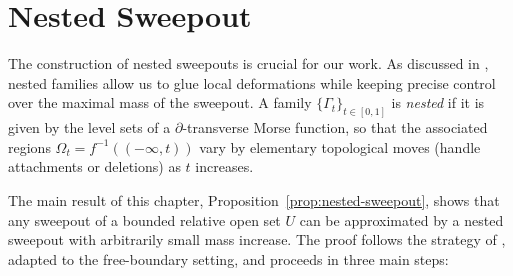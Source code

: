 \chapter{Nested Sweepout}\label{ch:nested-sweepout}

The construction of nested sweepouts is crucial for our work. As discussed in \cite[§6]{CL20}, nested families allow us to glue local deformations while keeping precise control over the maximal mass of the sweepout. A family $\{\Gamma_t\}_{t\in[0,1]}$ is \emph{nested} if it is given by the level sets of a $\partial$-transverse Morse function, so that the associated regions $\Omega_t = f^{-1}((-\infty,t))$ vary by elementary topological moves (handle attachments or deletions) as $t$ increases.

The main result of this chapter, Proposition~\ref{prop:nested-sweepout}, shows that any sweepout of a bounded relative open set $U$ can be approximated by a nested sweepout with arbitrarily small mass increase. The proof follows the strategy of \cite[Lemma~6.2]{CL20}, adapted to the free-boundary setting, and proceeds in three main steps:

